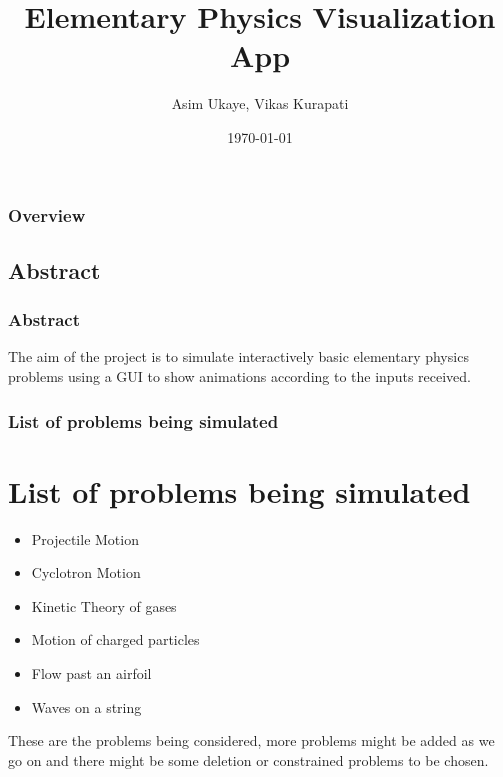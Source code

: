 \documentclass{beamer}
\title[Physics Simulator]{Elementary Physics Visualization App} %
\author{Asim Ukaye, Vikas Kurapati} %
\institute[SDES] %
{
Department of Aerospace Engineering \\ %
\medskip
\textbf{IIT Bombay} %
}
\date{\today} %
\begin{document}
\begin{frame}
\titlepage %
\end{frame}

\begin{frame}
\frametitle{Overview} %
\tableofcontents %
\end{frame}


\begin{frame}

\section{Abstract} 
\frametitle{Abstract}
The aim of the project is to simulate interactively basic elementary physics problems using a GUI to show animations according to the inputs received.
\end{frame}

\begin{frame}
\frametitle{List of problems being simulated}
\section{List of problems being simulated}
\begin{itemize}
\item Projectile Motion
\item Cyclotron Motion
\item Kinetic Theory of gases
\item Motion of charged particles
\item Flow past an airfoil
\item Waves on a string
\end{itemize}

These are the problems being considered, more problems might be added as we go on and there might be some deletion or constrained problems to be chosen.
\end{frame}
\end{document}
